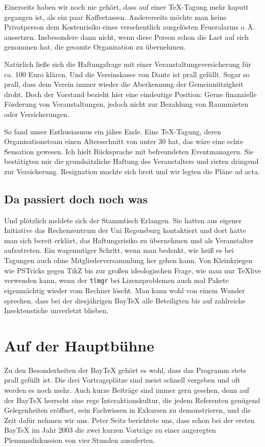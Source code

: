 \documentclass[ngerman]{dtk}
\begin{document}
Einerseits haben wir noch nie gehört, dass auf einer \TeX{}-Tagung mehr kaputt gegangen ist, als ein paar Kaffeetassen.
Andererseits möchte man keine Privatperson dem Kostenrisiko eines versehentlich ausgelösten Feueralarms o.\,Ä. aussetzen.
Insbesondere dann nicht, wenn diese Person schon die Last auf sich genommen hat, die gesamte Organisation zu übernehmen.

Natürlich ließe sich die Haftungsfrage mit einer Veranstaltungsversicherung für ca. 100 Euro klären.
Und die Vereinskasse von Dante ist prall gefüllt.
Sogar so prall, dass dem Verein immer wieder die Aberkennung
der Gemeinnützigkeit droht.
Doch der Vorstand bezieht hier eine eindeutige Position:
Gerne finanzielle Förderung von Veranstaltungen,
jedoch nicht zur Bezahlung von Raummieten oder Versicherungen.

So fand unser Enthusiasmus ein jähes Ende.
Eine \TeX{}-Tagung, deren Organisationsteam einen Altersschnitt von unter 30 hat, das wäre eine echte Sensation gewesen.
Ich hielt Rücksprache mit befreundeten Eventmanagern.
Sie bestätigten mir die grundsätzliche Haftung des Veranstalters und rieten dringend
zur Versicherung.
Resignation machte sich breit und wir legten die Pläne ad acta.

\subsection{Da passiert doch noch was}
Und plötzlich meldete sich der Stammtisch Erlangen.
Sie hatten aus eigener Initiative das Rechenzentrum der Uni Regensburg kontaktiert
und dort hatte man sich bereit erklärt, das Haftungsrisiko zu übernehmen
und als Veranstalter aufzutreten.
Ein wagemutiger Schritt, wenn man bedenkt, wie heiß es bei Tagungen auch ohne Mitgliederversammlung her gehen kann.
Von Kleinkriegen wie PSTricks gegen TikZ bis zur großen ideologischen Frage,
wie man nur \TeX{}live verwenden kann, wenn der \texttt{tlmgr} bei Lizenzproblemen
auch mal Pakete eigenmächtig wieder vom Rechner löscht.
Man kann wohl von einem Wunder sprechen, dass bei der diesjährigen Bay\TeX{} alle Beteiligten bis auf zahlreiche Insektenstiche unverletzt blieben.

\section{Auf der Hauptbühne}
Zu den Besonderheiten der Bay\TeX{} gehört es wohl, dass das Programm stets prall gefüllt ist.
Die drei Vortragsplätze sind meist schnell vergeben und oft werden es noch mehr.
Auch kurze Beiträge sind immer gern gesehen, denn auf der Bay\TeX{} herrscht
eine rege Interaktionskultur, die jedem Referenten genügend Gelegenheiten eröffnet,
sein Fachwissen in Exkursen zu demonstrieren, und die Zeit dafür nehmen wir uns.
Peter Seitz berichtete uns, dass schon bei der ersten Bay\TeX{} im Jahr 2003
die zwei kurzen Vorträge zu einer angeregten Plenumsdiskussion von vier Stunden ausuferten.
\end{document}
